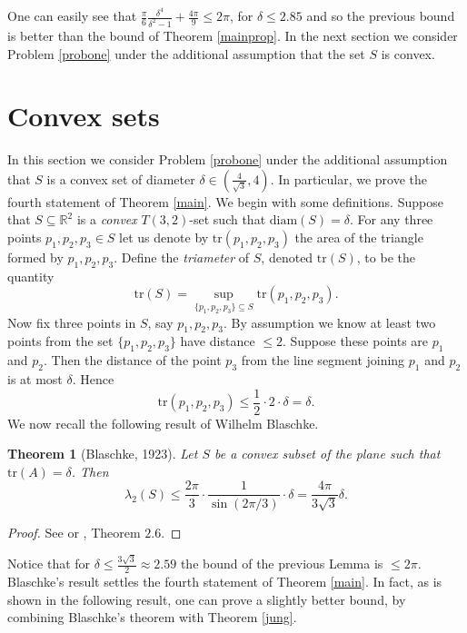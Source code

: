 \documentclass[12pt]{article}
\newtheorem{thm}{Theorem}[section]
\begin{document}
One can easily see that $\frac{\pi}{6}\frac{\delta^4}{\delta^2-1}+\frac{4\pi}{9}\leq 2\pi$, for $\delta\leq 2.85$ 
and so the previous bound is better than the bound of Theorem \ref{mainprop}.
In the next section we consider Problem \ref{probone} under the additional assumption that 
the set $S$ is convex. 

\section{Convex sets}\label{convex}

In this section we consider Problem \ref{probone} under the additional assumption that 
$S$ is a convex set of diameter $\delta\in (\frac{4}{\sqrt{3}}, 4)$. 
In particular, 
we prove the fourth statement of Theorem \ref{main}. 
We begin with some definitions. 
Suppose that $S\subseteq \mathbb{R}^2$ is a \emph{convex} $T(3,2)$-set   
such that $\text{diam}(S)=\delta$.
For any three points $p_1,p_2,p_3\in S$ let us denote by $\text{tr}(p_1,p_2,p_3)$ the 
area of the triangle formed by $p_1,p_2,p_3$. 
Define the \emph{triameter} of $S$, denoted $\text{tr}(S)$, to be the quantity
\[ \text{tr}(S) = \sup_{\{p_1,p_2,p_3\}\subseteq S} \text{tr}(p_1,p_2,p_3) . \]
Now fix three points in $S$, say $p_1,p_2,p_3$.
By assumption we know at least two points from 
the set $\{p_1,p_2,p_3\}$ have distance $\leq 2$. Suppose these points are $p_1$ and $p_2$. 
Then the distance of the point $p_3$ from the line segment joining $p_1$ and $p_2$ is at most $\delta$.
Hence 
\[ \text{tr}(p_1,p_2,p_3) \leq \frac{1}{2} \cdot 2\cdot\delta = \delta . \]
We now recall the following result of Wilhelm Blaschke.

\begin{thm}[Blaschke, 1923]
\label{Blaschke} Let $S$ be a convex subset of the plane such that $\text{tr}(A)=\delta$.
Then 
\[ \lambda_2(S) \leq \frac{2\pi}{3} \cdot \frac{1}{\sin(2\pi/3)} \cdot \delta = \frac{4\pi}{3\sqrt{3}}\delta. \]
\end{thm}
\begin{proof} See \cite{Chakerian} or \cite{Pach}, Theorem $2.6$.
\end{proof}

Notice that for $\delta \leq \frac{3\sqrt{3}}{2}\approx 2.59$ the bound of the previous Lemma is $\leq 2\pi$. 
Blaschke's result settles the fourth statement of Theorem \ref{main}.
In fact, as is shown in the following result, one can prove a 
slightly better bound, by combining Blaschke's theorem with Theorem \ref{jung}.
\end{document}
